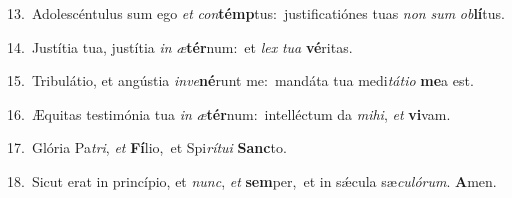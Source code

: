 {\numbfont\textcolor{\numbcolor}{13.}}~Adolescéntulus sum ego \textit{et} \textit{con}\-\textbf{témp}tus:~\star justificatiónes tuas \textit{non} \textit{sum} \textit{ob}\-\textbf{lí}tus.\par
{\numbfont\textcolor{\numbcolor}{14.}}~Justítia tua, justítia \textit{in} \textit{æ}\-\textbf{tér}num:~\star et \textit{lex} \textit{tu}\-\textit{a} \textbf{vé}\-ritas.\par
{\numbfont\textcolor{\numbcolor}{15.}}~Tribulátio, et angústia \textit{in}\-\textit{ve}\textbf{né}runt me:~\star mandáta tua medi\-\textit{tá}\-\textit{ti}\textit{o} \textbf{me}\-a est.\par
{\numbfont\textcolor{\numbcolor}{16.}}~Æquitas testimónia tua \textit{in} \textit{æ}\-\textbf{tér}num:~\star intelléctum da \textit{mi}\-\textit{hi}, \textit{et} \textbf{vi}\-vam.\par
{\numbfont\textcolor{\numbcolor}{17.}}~Glória Pa\-\textit{tri}\-, \textit{et} \textbf{Fí}\-lio,~\star et Spi\-\textit{rí}\-\textit{tu}\textit{i} \textbf{Sanc}\-to.\par
{\numbfont\textcolor{\numbcolor}{18.}}~Sicut erat in princípio, et \textit{nunc}\-, \textit{et} \textbf{sem}\-per,~\star et in sǽcula sæ\-\textit{cu}\-\textit{ló}\textit{rum}. \textbf{A}\-men.\par
